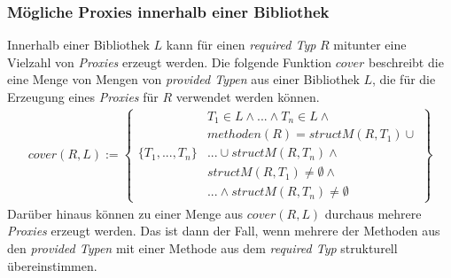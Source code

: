 \documentclass[a4paper,12pt]{article}
\begin{document}
\subsubsection{Mögliche Proxies innerhalb einer Bibliothek}
Innerhalb einer Bibliothek $L$ kann für einen \emph{required Typ} $R$ mitunter eine Vielzahl von \emph{Proxies} erzeugt werden. 
Die folgende Funktion $\mathit{cover}$ beschreibt die eine Menge von Mengen von \emph{provided Typen} aus einer Bibliothek $L$, die für die Erzeugung eines \emph{Proxies} für $R$ verwendet werden können.
\begin{gather*}
cover(R,L) := 
\left\{\begin{array}{l|l}
					& T_1 \in L \wedge \text{...} \wedge T_n \in L \wedge \\
					& methoden(R) = structM(R,T_1) \cup \\
	\{T_1,...,T_n\}	& \texttt{...} \cup structM(R, T_n) \wedge \\
					& \mathit{structM(R,T_1)} \neq \emptyset \wedge \\
					& \texttt{...}\wedge \mathit{structM(R,T_n)} \neq \emptyset 
\end{array}\right\}
\end{gather*}
Darüber hinaus können zu einer Menge aus $\mathit{cover(R,L)}$ durchaus mehrere \emph{ Proxies} erzeugt werden. Das ist dann der Fall, wenn mehrere der Methoden aus den \emph{provided Typen} mit einer Methode aus dem \emph{required Typ} strukturell übereinstimmen. 
\end{document}
